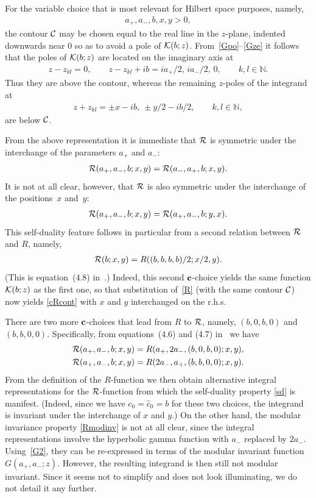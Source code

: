 \documentclass[11pt]{article}
\numberwithin{equation}{section}
\newcommand{\N}{{\mathbb N}}
\newcommand{\cR}{{\cal R}}
\newcommand{\cC}{{\cal C}}
\newcommand{\cK}{{\cal K}}
\newcommand{\aaa}{a_{+},a_{-}}
\begin{document}
For the variable choice that is most relevant for Hilbert space purposes, namely,
\begin{gather}\label{Hpar}
\aaa,b,x,y>0,
\end{gather}
the contour $\cC$ may be chosen equal to the real line in the $z$-plane, indented downwards near 0 so as to avoid a pole of $\cK(b;z)$. From~\eqref{Gpo}--\eqref{Gze} it follows that the poles of $\cK(b;z)$ are located on the imaginary axis at
\begin{gather}\label{Kpoles}
z-z_{kl}=0,\qquad z-z_{kl}+ib=ia_{+}/2, \, ia_{-}/2, \, 0,\qquad k,l\in\N.
\end{gather}
Thus they are above the contour, whereas the remaining $z$-poles of the integrand at
\begin{gather}
z+z_{kl}=\pm x-ib,\  \pm y/2-ib/2,\qquad  k,l\in\N,
\end{gather}
are below $\cC$.

From the above representation it is immediate that $\cR$ is symmetric under the interchange of the parameters $a_{+}$ and $a_{-}$:
\begin{gather}\label{Rmodinv}
\cR(a_{+},a_{-},b;x,y)=\cR(a_{-},a_{+},b;x,y).
\end{gather}
It is not at all clear, however, that $\cR$ is also symmetric under the interchange of the positions~$x$ and~$y$:
\begin{gather}\label{sd}
\cR(a_{+},a_{-},b;x,y)=\cR(a_{+},a_{-},b;y,x).
\end{gather}
 This self-duality feature follows in particular from a second relation between $\cR$ and $R$, namely,
\begin{gather}\label{cR2}
\cR(b;x,y)=R((b,b,b,b)/2;x/2,y).
\end{gather}
(This is equation~(4.8) in~\cite{quad}.) Indeed, this second ${\bf c}$-choice yields the same function $\cK(b;z)$ as the f\/irst one, so that substitution of~\eqref{R} (with the same contour $\cC$) now yields \eqref{cRcont} with $x$ and $y$ interchanged on the r.h.s.

There are two more ${\bf c}$-choices that lead from $R$ to $\cR$, namely, $(b,0,b,0)$ and $(b,b,0,0)$. Specif\/ically, from equations~(4.6) and (4.7) in~\cite{quad} we have
\begin{gather}\label{cR3}
\cR(\aaa,b;x,y)=R(a_{+},2a_{-},(b,0,b,0);x,y),
\\
\label{cR4}
\cR(\aaa,b;x,y)=R(2a_{-},a_{+},(b,b,0,0);x,y).
\end{gather}
From the def\/inition of the $R$-function we then obtain alternative integral representations for the $\cR$-function from which the self-duality property \eqref{sd} is manifest. (Indeed, since we have $c_0=\hat{c}_0=b$ for these two choices, the integrand is invariant under the interchange of $x$ and $y$.) On the other hand, the modular invariance property \eqref{Rmodinv} is not at all clear, since the integral representations involve the hyperbolic gamma function
 with $a_{-}$ replaced by $2a_{-}$. Using~\eqref{G2},
 they can be re-expressed in terms of the modular invariant function $G(\aaa;z)$. However, the resulting integrand is then still not modular invariant. Since it seems not to simplify and does not look
illuminating, we do not detail it any further.
\end{document}
